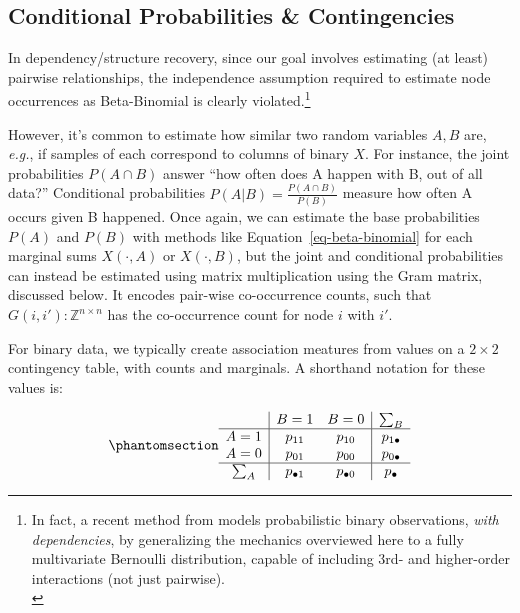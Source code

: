 \documentclass[%
	12pt,
		oneside,
		letterpaper
]{book}
\begin{document}
\subsection{Conditional Probabilities \&
Contingencies}\label{conditional-probabilities-contingencies}

In dependency/structure recovery, since our goal involves estimating (at
least) pairwise relationships, the independence assumption required to
estimate node occurrences as Beta-Binomial is clearly
violated.\footnote{ In fact, a recent method from
  \autocite{MultivariateBernoullidistribution_Dai2013} models
  probabilistic binary observations, \emph{with dependencies}, by
  generalizing the mechanics overviewed here to a fully multivariate
  Bernoulli distribution, capable of including 3rd- and higher-order
  interactions (not just pairwise).\\
}

However, it's common to estimate how similar two random variables
\(A,B\) are, \emph{e.g.}, if samples of each correspond to columns of
binary \(X\). For instance, the joint probabilities \(P(A\cap B)\)
answer ``how often does A happen with B, out of all data?'' Conditional
probabilities \(P(A|B)=\frac{P(A\cap B)}{P(B)}\) measure how often A
occurs given B happened. Once again, we can estimate the base
probabilities \(P(A)\) and \(P(B)\) with methods like
Equation~\ref{eq-beta-binomial} for each marginal sums \(X(\cdot,A)\) or
\(X(\cdot,B)\), but the joint and conditional probabilities can instead
be estimated using matrix multiplication using the Gram matrix,
discussed below. It encodes pair-wise co-occurrence counts, such that
\(G(i,i'):\mathbb{Z}^{n\times n}\) has the co-occurrence count for node
\(i\) with \(i'\).

For binary data, we typically create association meatures from values on
a \(2\times2\) contingency table, with counts and marginals. A shorthand
notation for these values is:

\begin{equation}\phantomsection\label{eq-contingency}{
\begin{array}{c|cc|c}
      & B=1         & B=0         & \sum_B \\
\hline 
A=1   & p_{11}      & p_{10}      & p_{1\bullet} \\
A=0   & p_{01}      & p_{00}      & p_{0\bullet} \\
\hline 
\sum_A   & p_{\bullet 1} & p_{\bullet 0} & p_\bullet \\
\end{array}
}\end{equation}
\end{document}
